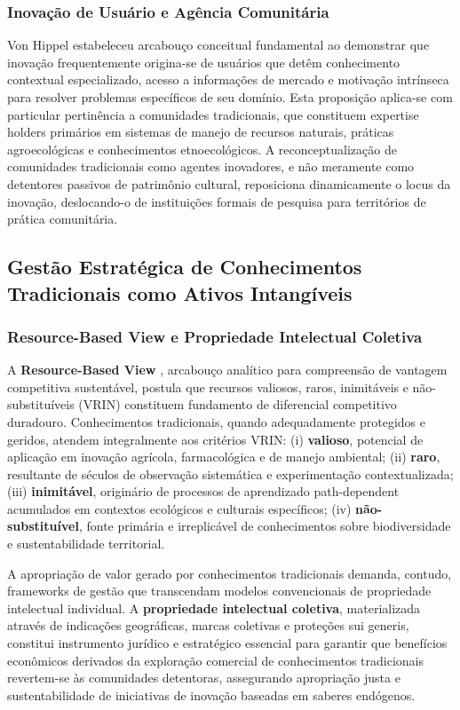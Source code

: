 \subsubsection{Inovação de Usuário e Agência Comunitária}

Von Hippel \cite{vonHippel1988} estabeleceu arcabouço conceitual fundamental ao demonstrar que inovação frequentemente origina-se de usuários que detêm conhecimento contextual especializado, acesso a informações de mercado e motivação intrínseca para resolver problemas específicos de seu domínio. Esta proposição aplica-se com particular pertinência a comunidades tradicionais, que constituem expertise holders primários em sistemas de manejo de recursos naturais, práticas agroecológicas e conhecimentos etnoecológicos. A reconceptualização de comunidades tradicionais como agentes inovadores, e não meramente como detentores passivos de patrimônio cultural, reposiciona dinamicamente o locus da inovação, deslocando-o de instituições formais de pesquisa para territórios de prática comunitária.

\subsection{Gestão Estratégica de Conhecimentos Tradicionais como Ativos Intangíveis}

\subsubsection{Resource-Based View e Propriedade Intelectual Coletiva}

A \textbf{Resource-Based View} \cite{Barney1991}, arcabouço analítico para compreensão de vantagem competitiva sustentável, postula que recursos valiosos, raros, inimitáveis e não-substituíveis (VRIN) constituem fundamento de diferencial competitivo duradouro. Conhecimentos tradicionais, quando adequadamente protegidos e geridos, atendem integralmente aos critérios VRIN: (i) \textbf{valioso}, potencial de aplicação em inovação agrícola, farmacológica e de manejo ambiental; (ii) \textbf{raro}, resultante de séculos de observação sistemática e experimentação contextualizada; (iii) \textbf{inimitável}, originário de processos de aprendizado path-dependent acumulados em contextos ecológicos e culturais específicos; (iv) \textbf{não-substituível}, fonte primária e irreplicável de conhecimentos sobre biodiversidade e sustentabilidade territorial.

A apropriação de valor gerado por conhecimentos tradicionais demanda, contudo, frameworks de gestão que transcendam modelos convencionais de propriedade intelectual individual. A \textbf{propriedade intelectual coletiva}, materializada através de indicações geográficas, marcas coletivas e proteções sui generis, constitui instrumento jurídico e estratégico essencial para garantir que benefícios econômicos derivados da exploração comercial de conhecimentos tradicionais revertem-se às comunidades detentoras, assegurando apropriação justa e sustentabilidade de iniciativas de inovação baseadas em saberes endógenos.

